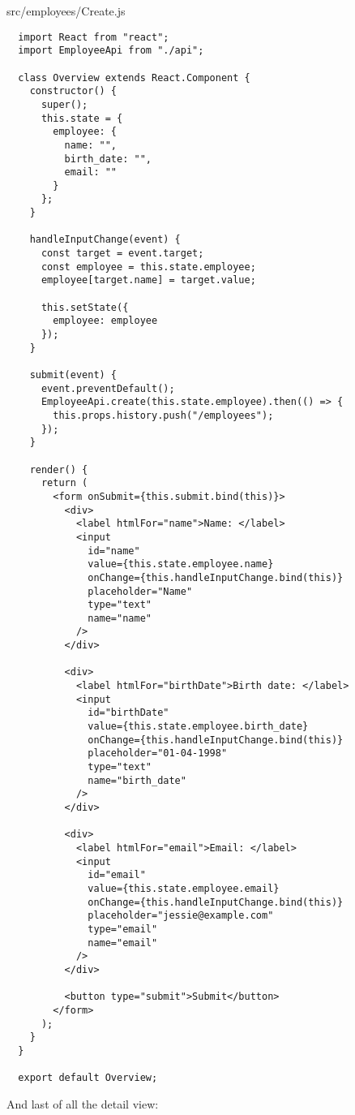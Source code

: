 src/employees/Create.js
\begin{verbatim}
  import React from "react";
  import EmployeeApi from "./api";

  class Overview extends React.Component {
    constructor() {
      super();
      this.state = {
        employee: {
          name: "",
          birth_date: "",
          email: ""
        }
      };
    }

    handleInputChange(event) {
      const target = event.target;
      const employee = this.state.employee;
      employee[target.name] = target.value;

      this.setState({
        employee: employee
      });
    }

    submit(event) {
      event.preventDefault();
      EmployeeApi.create(this.state.employee).then(() => {
        this.props.history.push("/employees");
      });
    }

    render() {
      return (
        <form onSubmit={this.submit.bind(this)}>
          <div>
            <label htmlFor="name">Name: </label>
            <input
              id="name"
              value={this.state.employee.name}
              onChange={this.handleInputChange.bind(this)}
              placeholder="Name"
              type="text"
              name="name"
            />
          </div>

          <div>
            <label htmlFor="birthDate">Birth date: </label>
            <input
              id="birthDate"
              value={this.state.employee.birth_date}
              onChange={this.handleInputChange.bind(this)}
              placeholder="01-04-1998"
              type="text"
              name="birth_date"
            />
          </div>

          <div>
            <label htmlFor="email">Email: </label>
            <input
              id="email"
              value={this.state.employee.email}
              onChange={this.handleInputChange.bind(this)}
              placeholder="jessie@example.com"
              type="email"
              name="email"
            />
          </div>

          <button type="submit">Submit</button>
        </form>
      );
    }
  }

  export default Overview;
\end{verbatim}

And last of all the detail view:


